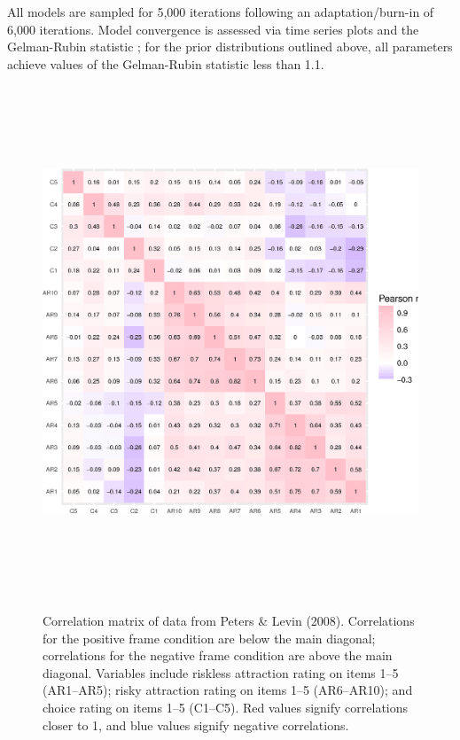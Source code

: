 All models are sampled for 5,000 iterations following an adaptation/burn-in of 6,000 iterations.   Model convergence is assessed via time series plots and the Gelman-Rubin statistic \cite{gelrub92}; for the prior distributions outlined above, all parameters achieve values of the Gelman-Rubin statistic less than 1.1.   

\begin{figure}[p]
{\centering \includegraphics[width=6.7in,height=6in]{figs/em1_bayes-fig1-1}} 
\caption{Correlation matrix of data from Peters \& Levin (2008).  Correlations for the positive frame condition are below the main diagonal; correlations for the negative frame condition are above the main diagonal.  Variables include riskless attraction rating on items 1--5 (AR1--AR5); risky attraction rating on items 1--5 (AR6--AR10); and choice rating on items 1--5 (C1--C5).  Red values signify correlations closer to 1, and blue values signify negative correlations.}
\label{fig:em1:data}
\end{figure}


